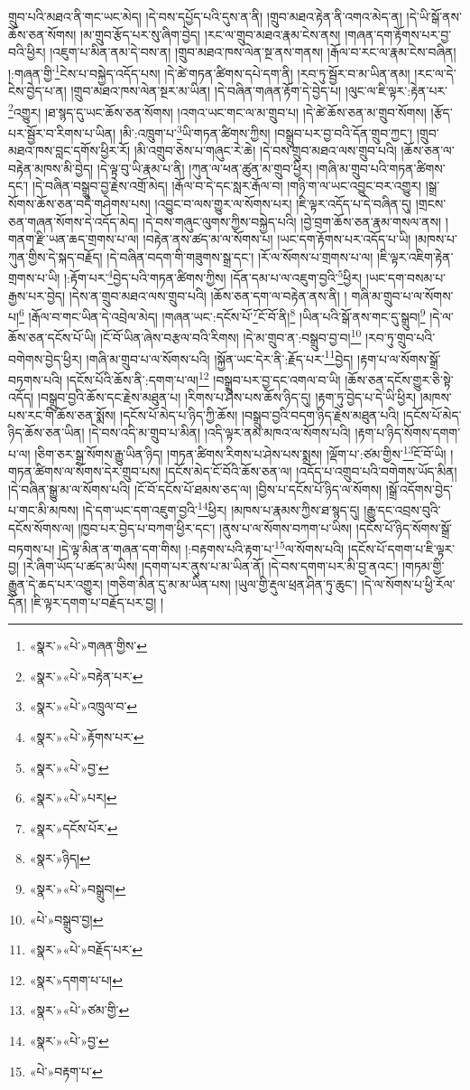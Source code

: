 གྲུབ་པའི་མཐའ་ནི་གང་ཡང་མེད། །དེ་བས་དཔྱོད་པའི་དུས་ན་ནི། །གྲུབ་མཐའ་རྟེན་ནི་འགའ་མེད་ན། །དེ་ཡི་སྒོ་ནས་ཆོས་ཅན་སོགས། །མ་གྲུབ་རྩོད་པར་སུ་ཞིག་བྱེད། །རང་ལ་གྲུབ་མཐའ་རྣམ་ངེས་ནས། །གཞན་དག་རྟོགས་པར་བྱ་བའི་ཕྱིར། །འཇུག་པ་མིན་ནམ་དེ་བས་ན། །གྲུབ་མཐའ་ཁས་ལེན་སྔ་ནས་གནས། །རྒོལ་བ་རང་ལ་རྣམ་ངེས་བཞིན། །:གཞན་གྱི་\footnote{«སྣར་»«པེ་»གཞན་གྱིས་}ངེས་པ་བསྐྱེད་འདོད་པས། །དེ་ཚེ་གཏན་ཚིགས་དཔེ་དག་ནི། །རབ་ཏུ་སྦྱོར་བ་མ་ཡིན་ནམ། །རང་ལ་དེ་ངེས་བྱེད་པ་ན། །གྲུབ་མཐའ་ཁས་ལེན་སྔར་མ་ཡིན། །དེ་བཞིན་གཞན་རྟོག་དེ་བྱེད་པ། །ལུང་ལ་ཇི་ལྟར་:རྟེན་པར་\footnote{«སྣར་»«པེ་»བརྟེན་པར་}འགྱུར། །ཐ་སྙད་དུ་ཡང་ཆོས་ཅན་སོགས། །འགའ་ཡང་གང་ལ་མ་གྲུབ་པ། །དེ་ཚེ་ཆོས་ཅན་མ་གྲུབ་སོགས། །རྩོད་པར་སྦྱོར་བ་རིགས་པ་ཡིན། །མི་:འཁྲུག་པ་\footnote{«སྣར་»«པེ་»འཁྲུལ་བ་}ཡི་གཏན་ཚིགས་ཀྱིས། །བསྒྲུབ་པར་བྱ་བའི་དོན་གྲུབ་ཀྱང་། །གྲུབ་མཐའ་ཁས་བླང་དགོས་ཕྱིར་རོ། །མི་འགྲུབ་ཅེས་པ་གཞུང་རེ་ཆེ། །དེ་བས་གྲུབ་མཐའ་ལས་གྲུབ་པའི། །ཆོས་ཅན་ལ་བརྟེན་མཁས་མི་བྱེད། །དེ་ལྟ་བུ་ཡི་རྣམ་པ་ནི། །ཀུན་ལ་ཕན་ཚུན་མ་གྲུབ་ཕྱིར། །གཞི་མ་གྲུབ་པའི་གཏན་ཚིགས་དང་། །དེ་བཞིན་བསྒྲུབ་བྱ་རྗེས་འགྲོ་མེད། །རྒོལ་བ་དེ་དང་སླར་རྒོལ་བ། །གཉི་ག་ལ་ཡང་འབྱུང་བར་འགྱུར། །སྒྲ་སོགས་ཆོས་ཅན་བདེ་གཤེགས་པས། །འབྱུང་བ་ལས་གྱུར་ལ་སོགས་པར། །ཇི་ལྟར་འདོད་པ་དེ་བཞིན་དུ། །གྲངས་ཅན་གཞན་སོགས་དེ་འདོད་མེད། །དེ་བས་གཞུང་ལུགས་ཀྱིས་བསྐྱེད་པའི། །བྱེ་བྲག་ཆོས་ཅན་རྣམ་གསལ་ནས། །གནག་རྫི་ཡན་ཆད་གྲགས་པ་ལ། །བརྟེན་ནས་ཚད་མ་ལ་སོགས་པ། །ཡང་དག་རྟོགས་པར་འདོད་པ་ཡི། །མཁས་པ་ཀུན་གྱིས་དེ་སྐད་བརྗོད། །དེ་བཞིན་བདག་གི་གཟུགས་སྒྲ་དང་། །རོ་ལ་སོགས་པ་གྲགས་པ་ལ། །ཇི་ལྟར་འཇིག་རྟེན་གྲགས་པ་ཡི། །:རྟོག་པར་\footnote{«སྣར་»«པེ་»རྟོགས་པར་}བྱེད་པའི་གཏན་ཚིགས་ཀྱིས། །དོན་དམ་པ་ལ་འཇུག་བྱའི་\footnote{«སྣར་»«པེ་»བྱ་}ཕྱིར། །ཡང་དག་བསམ་པ་རྒྱས་པར་བྱེད། །དེས་ན་གྲུབ་མཐའ་ལས་གྲུབ་པའི། །ཆོས་ཅན་དག་ལ་བརྟེན་ནས་ནི། །
གཞི་མ་གྲུབ་པ་ལ་སོགས་པ།\footnote{«སྣར་»«པེ་»པར།} །རྒོལ་བ་གང་ཡིན་དེ་འབྲེལ་མེད། །གཞན་ཡང་:དངོས་པོ་\footnote{«སྣར་»དངོས་པོར་}ངོ་བོ་ནི།\footnote{«སྣར་»ཉིད།} །ཡིན་པའི་སྒོ་ནས་གང་དུ་སྒྲུབ།\footnote{«སྣར་»«པེ་»བསྒྲུབ།} །དེ་ལ་ཆོས་ཅན་དངོས་པོ་ཡི། །ངོ་བོ་ཡིན་ཞེས་བརྩལ་བའི་རིགས། །དེ་མ་གྲུབ་ན་:བསྒྲུབ་བྱ་བ།\footnote{«པེ་»བསྒྲུབ་བྱ།} །རབ་ཏུ་གྲུབ་པའི་བགེགས་བྱེད་ཕྱིར། །གཞི་མ་གྲུབ་པ་ལ་སོགས་པའི། །སྐྱོན་ཡང་དེར་ནི་:རྗོད་པར་\footnote{«སྣར་»«པེ་»བརྗོད་པར་}བྱེད། །རྟག་པ་ལ་སོགས་སྒྲོ་བཏགས་པའི། །དངོས་པོའི་ཆོས་ནི་:དགག་པ་ལ།\footnote{«སྣར་»དགག་པ་པ།} །བསྒྲུབ་པར་བྱ་དང་འགལ་བ་ཡི། །ཆོས་ཅན་དངོས་གྱུར་ཅི་སྟེ་འདོད། །བསྒྲུབ་བྱའི་ཆོས་དང་རྗེས་མཐུན་པ། །རིགས་པ་ཤེས་པས་ཆོས་ཉིད་དུ། །རྟག་ཏུ་བྱེད་པ་དེ་ཡི་ཕྱིར། །མཁས་པས་རང་གི་ཆོས་ཅན་སྨོས། །དངོས་པོ་མེད་པ་ཉིད་ཀྱི་ཆོས། །བསྒྲུབ་བྱའི་བདག་ཉིད་རྗེས་མཐུན་པའི། །དངོས་པོ་མེད་ཉིད་ཆོས་ཅན་ཡིན། །དེ་བས་འདི་མ་གྲུབ་པ་མིན། །འདི་ལྟར་ནམ་མཁའ་ལ་སོགས་པའི། །རྟག་པ་ཉིད་སོགས་དགག་པ་ལ། །ཅིག་ཅར་སྒྲ་སོགས་རྒྱུ་ཡིན་ཉིད། །གཏན་ཚིགས་རིགས་པ་ཤེས་པས་སྨྲས། །ལྡོག་པ་:ཙམ་གྱིས་\footnote{«སྣར་»«པེ་»ཙམ་གྱི་}ངོ་བོ་ཡི། །གཏན་ཚིགས་ལ་སོགས་དེར་གྲུབ་པས། །དངོས་མེད་ངོ་བོའི་ཆོས་ཅན་ལ། །འདོད་པ་འགྲུབ་པའི་བགེགས་ཡོད་མིན། །དེ་བཞིན་སྒྱུ་མ་ལ་སོགས་པའི། །ངོ་བོ་དངོས་པོ་ཐམས་ཅད་ལ། །བྱིས་པ་དངོས་པོ་ཉིད་ལ་སོགས། །སྒྲོ་འདོགས་བྱེད་པ་གང་མི་མཁས། །དེ་དག་ཡང་དག་འཇུག་བྱའི་\footnote{«སྣར་»«པེ་»བྱ་}ཕྱིར། །མཁས་པ་རྣམས་ཀྱིས་ཐ་སྙད་དུ། །རྒྱུ་དང་འབྲས་བུའི་དངོས་སོགས་ལ། །ཁྱབ་པར་བྱེད་པ་བཀག་ཕྱིར་དང་། །ནུས་པ་ལ་སོགས་བཀག་པ་ཡིས། །དངོས་པོ་ཉིད་སོགས་སྒྲོ་བཏགས་པ། །དེ་ལྟ་མིན་ན་གཞན་དག་གིས། །:བརྟགས་པའི་རྟག་པ་\footnote{«པེ་»བརྟག་པ་}ལ་སོགས་པའི། །དངོས་པོ་དགག་པ་ཇི་ལྟར་བྱ། །རེ་ཞིག་ཡོད་པ་ཚད་མ་ཡིས། །དགག་པར་ནུས་པ་མ་ཡིན་ནོ། །དེ་བས་དགག་པར་མི་བྱ་ནའང་། །གཏམ་གྱི་རྒྱུན་དེ་ཆད་པར་འགྱུར། །གཅིག་མིན་དུ་མ་མ་ཡིན་པས། །ཡུལ་གྱི་རྡུལ་ཕྲན་ཤིན་ཏུ་ཆུང་། །དེ་ལ་སོགས་པ་ཕྱི་རོལ་དོན། །ཇི་ལྟར་དགག་པ་བརྗོད་པར་བྱ། །
